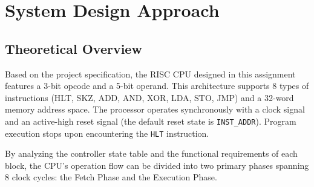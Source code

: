 \section{System Design Approach}\label{sec:system_design_approach} %
\subsection{Theoretical Overview}
Based on the project specification, the RISC CPU designed in this assignment features a 3-bit opcode and a 5-bit operand. This architecture supports 8 types of instructions (HLT, SKZ, ADD, AND, XOR, LDA, STO, JMP) and a 32-word memory address space. The processor operates synchronously with a clock signal and an active-high reset signal (the default reset state is \texttt{INST\_ADDR}). Program execution stops upon encountering the \texttt{HLT} instruction.

By analyzing the controller state table and the functional requirements of each block, the CPU's operation flow can be divided into two primary phases spanning 8 clock cycles: the Fetch Phase and the Execution Phase.

